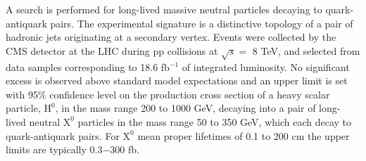 A search is performed for long-lived massive neutral particles decaying
 to quark-antiquark pairs. The experimental signature is a distinctive topology of a pair of
 hadronic jets originating at a
 secondary vertex.
 Events were collected by the CMS detector at the LHC during pp collisions at $\sqrt{s}=$ 8 TeV, and selected from data samples corresponding to 18.6 fb$^{-1}$ of integrated luminosity. No significant excess
 is observed above standard model expectations and an upper limit is set with 95$\%$ confidence level
 on the production cross section of a heavy scalar particle,
  $\text{H}^0$, in the mass range 200 to 1000 GeV, decaying into a pair of long-lived neutral $\text{X}^0$
   particles in the mass
   range 50 to 350 GeV, which each decay to quark-antiquark pairs. For $\text{X}^0$ mean proper lifetimes
   of 0.1 to 200 cm
    the upper limits are typically 0.3$-$300 fb.
